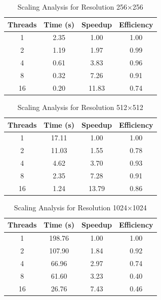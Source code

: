 \documentclass[unicode,11pt,a4paper,oneside,numbers=endperiod,openany]{scrartcl}
\begin{document}
\begin{table}[!h]
\centering
\caption{Scaling Analysis for Resolution 256×256}
\begin{tabular}{cccc}
\hline
Threads & Time (s) & Speedup & Efficiency \\
\hline
1 & 2.35 & 1.00 & 1.00 \\
2 & 1.19 & 1.97 & 0.99 \\
4 & 0.61 & 3.83 & 0.96 \\
8 & 0.32 & 7.26 & 0.91 \\
16 & 0.20 & 11.83 & 0.74 \\
\hline
\end{tabular}
\end{table}
\FloatBarrier

\begin{table}[!h]
\centering
\caption{Scaling Analysis for Resolution 512×512}
\begin{tabular}{cccc}
\hline
Threads & Time (s) & Speedup & Efficiency \\
\hline
1 & 17.11 & 1.00 & 1.00 \\
2 & 11.03 & 1.55 & 0.78 \\
4 & 4.62 & 3.70 & 0.93 \\
8 & 2.35 & 7.28 & 0.91 \\
16 & 1.24 & 13.79 & 0.86 \\
\hline
\end{tabular}
\end{table}
\FloatBarrier

\begin{table}[!h]
\centering
\caption{Scaling Analysis for Resolution 1024×1024}
\begin{tabular}{cccc}
\hline
Threads & Time (s) & Speedup & Efficiency \\
\hline
1 & 198.76 & 1.00 & 1.00 \\
2 & 107.90 & 1.84 & 0.92 \\
4 & 66.96 & 2.97 & 0.74 \\
8 & 61.60 & 3.23 & 0.40 \\
16 & 26.76 & 7.43 & 0.46 \\
\hline
\end{tabular}
\end{table}
\FloatBarrier
\end{document}
